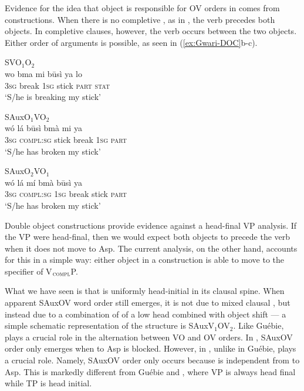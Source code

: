 \documentclass[output=paper,newtxmath,modfonts,nonflat,draftmode]{langsci/langscibook}
\begin{document}
Evidence for the idea that object  is responsible for OV orders in  comes from  constructions. When there is no completive , as in , the verb precedes both objects. In completive clauses, however, the verb occurs between the two objects. Either order of arguments is possible, as seen in (\ref{ex:Gwari-DOC}b-c). 

\ea \label{ex:Gwari-DOC}

\ea \label{ex:Gwari-DOC-VOO} {SVO$_1$O$_2$}	\\
\gll wo bma mi b\={u}sì ya lo \\
3\textsc{sg} break 1\textsc{sg} stick \textsc{part} \textsc{stat} \\
\glt `S/he is breaking my stick' \hfill \citep[][92]{hyman1970}

\ex \label{ex:Gwari-DOC-O1VO2} {SAuxO$_1$VO$_2$}	\\
\gll wó lá  b\={u}sì bmà mi ya \\
3\textsc{sg} \textsc{compl:sg} stick break 1\textsc{sg} \textsc{part}  \\
\glt `S/he has broken my stick' \hfill \citep[][93]{hyman1970}

\ex \label{ex:Gwari-DOC-O2VO1}{SAuxO$_2$VO$_1$}	\\
\gll wó lá mí bmà b\={u}sì ya \\
3\textsc{sg} \textsc{compl:sg} 1\textsc{sg} break stick \textsc{part} \\
\glt `S/he has broken my stick'	\hfill \citep[][93]{hyman1970}
\z

\z
Double object constructions provide evidence against a head-final VP analysis. If the  VP were head-final, then we would expect both objects to precede the verb when it does not move to Asp. The current analysis, on the other hand, accounts for this in a simple way: either object in a  construction is able to move to the specifier of V$_\textsc{compl}$P.

What we have seen is that  is uniformly head-initial in its clausal spine. When apparent SAuxOV word order still emerges, it is not due to mixed clausal , but instead due to a combination of  of a low  head combined with object shift --- a simple schematic representation of the structure is SAuxV$_1$OV$_2$. Like Guébie,  plays a crucial role in the alternation between VO and OV orders. In , SAuxOV order only emerges when  to Asp is blocked. However, in , unlike in Guébie,  plays a crucial role. Namely, SAuxOV order only occurs because  is independent from  to Asp. This is markedly different from Guébie and , where VP is always head final while TP is head initial.
\end{document}
